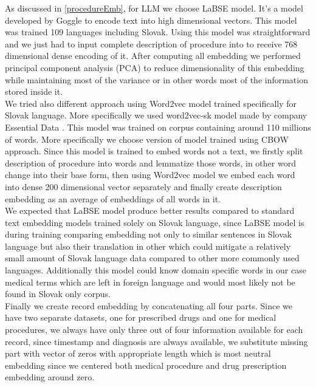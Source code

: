 As discussed in \ref{procedureEmb}, for LLM we choose LaBSE model. It's a model developed by Goggle to encode text into high dimensional vectors. This model was trained 109 languages including Slovak.  Using this model was straightforward and we just had to input complete description of procedure into to receive 768 dimensional dense encoding of it. After computing all embedding we performed principal component analysis (PCA) to reduce dimensionality of this embedding while maintaining most of the variance or in other words most of the information stored inside it.
\\

We tried also different approach using Word2vec model trained specifically for Slovak language. More specifically we used word2vec-sk model made by company Essential Data \cite{w2v}. This model was trained on corpus containing around 110 millions of words. More specifically we choose version of model trained using CBOW approach. Since this model is trained to embed words not a text, we firstly split description of procedure into words and lemmatize those words, in other word change into their base form, then using Word2vec model we embed each word into dense 200 dimensional vector separately and finally create description embedding as an average of embeddings of all words in it.
\\

We expected that LaBSE model produce better results compared to standard text embedding models trained solely on Slovak language, since LaBSE model is during training comparing embedding not only to similar sentences in Slovak language but also their translation in other which could mitigate a relatively small amount of Slovak language data compared to other more commonly used languages. Additionally this model could know domain specific words in our case medical terms which are left in foreign language and would most likely not be found in Slovak only corpus. 
\\

Finally we create record embedding by concatenating all four parts. Since we have two separate datasets, one for prescribed drugs and one for medical procedures, we always have only three out of four information available for each record, since timestamp and diagnosis are always available, we substitute missing part with vector of zeros with appropriate length which is most neutral embedding since we centered both medical procedure and drug prescription embedding around zero.
